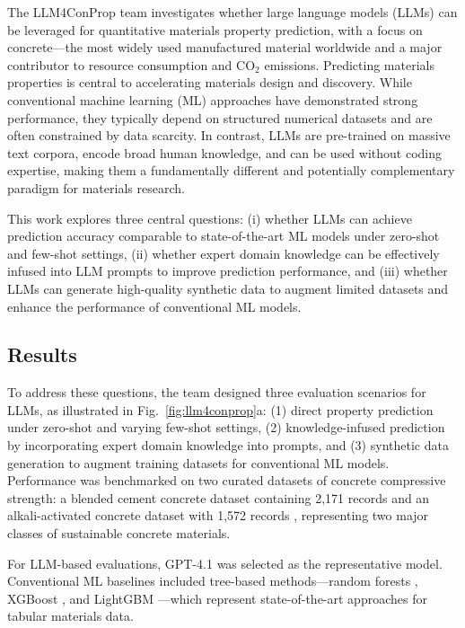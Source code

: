 The LLM4ConProp team investigates whether large language models (LLMs) can be leveraged for quantitative materials property prediction, with a focus on concrete—the most widely used manufactured material worldwide and a major contributor to resource consumption and CO$_2$ emissions. Predicting materials properties is central to accelerating materials design and discovery. While conventional machine learning (ML) approaches have demonstrated strong performance, they typically depend on structured numerical datasets and are often constrained by data scarcity. In contrast, LLMs are pre-trained on massive text corpora, encode broad human knowledge, and can be used without coding expertise, making them a fundamentally different and potentially complementary paradigm for materials research.

This work explores three central questions: (i) whether LLMs can achieve prediction accuracy comparable to state-of-the-art ML models under zero-shot and few-shot settings, (ii) whether expert domain knowledge can be effectively infused into LLM prompts to improve prediction performance, and (iii) whether LLMs can generate high-quality synthetic data to augment limited datasets and enhance the performance of conventional ML models.


\subsection*{Results}

To address these questions, the team designed three evaluation scenarios for LLMs, as illustrated in Fig.~\ref{fig:llm4conprop}a: (1) direct property prediction under zero-shot and varying few-shot settings, (2) knowledge-infused prediction by incorporating expert domain knowledge into prompts, and (3) synthetic data generation to augment training datasets for conventional ML models. Performance was benchmarked on two curated datasets of concrete compressive strength: a blended cement concrete dataset containing 2,171 records \cite{Imran2023} and an alkali-activated concrete dataset with 1,572 records \cite{Torres2023}, representing two major classes of sustainable concrete materials.

For LLM-based evaluations, GPT-4.1 was selected as the representative model. Conventional ML baselines included tree-based methods—random forests \cite{Breiman2001}, XGBoost \cite{Chen2016a}, and LightGBM \cite{Ke2017}—which represent state-of-the-art approaches for tabular materials data.

